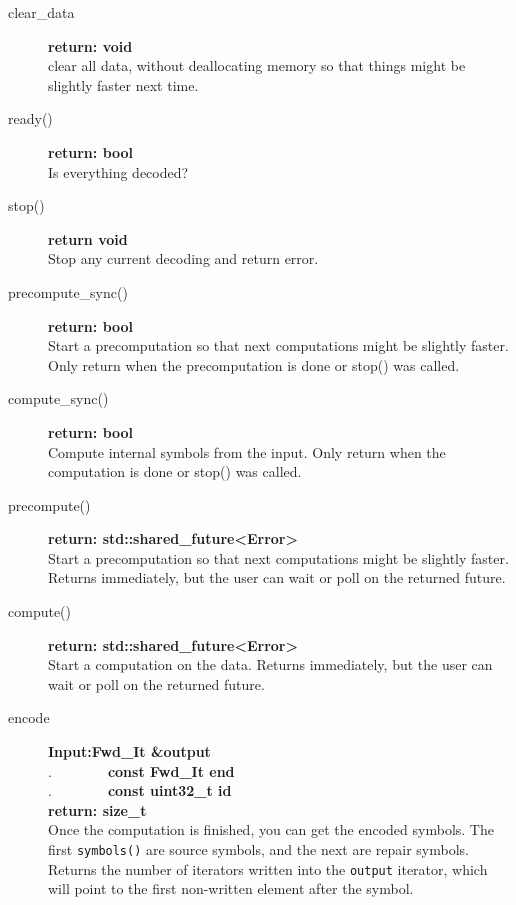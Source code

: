 \documentclass[11pt,a4paper]{refart}
\begin{document}
\begin{description}
\item[clear\_data]\textbf{return: void}\\
clear all data, without deallocating memory so that things might be slightly faster next time.

\item[ready()]\textbf{return: bool}\\
Is everything decoded?

\item[stop()]\textbf{return void}\\
Stop any current decoding and return error.

\item[precompute\_sync()]\textbf{return: bool}\\
Start a precomputation so that next computations might be slightly faster. Only return when the precomputation is done or stop() was called.

\item[compute\_sync()]\textbf{return: bool}\\
Compute internal symbols from the input. Only return when the computation is done or stop() was called.

\item[precompute()] \textbf{return: std::shared\_future<Error>}\\
Start a precomputation so that next computations might be slightly faster. Returns immediately, but the user can wait or poll on the returned future.

\item[compute()] \textbf{return: std::shared\_future<Error>}\\
Start a computation on the data. Returns immediately, but the user can wait or poll on the returned future.

\item[encode]\textbf{Input:Fwd\_It \&output}\\
.\ \ \ \ \ \ \ \ \textbf{const Fwd\_It end}\\
.\ \ \ \ \ \ \ \ \textbf{const uint32\_t id}\\
\textbf{return: size\_t}\\
Once the computation is finished, you can get the encoded symbols. The first \texttt{symbols()} are source symbols, and the next are repair symbols. Returns the number of iterators written into the \texttt{output} iterator, which will point to the first non-written element after the symbol.

\end{description}
\end{document}
